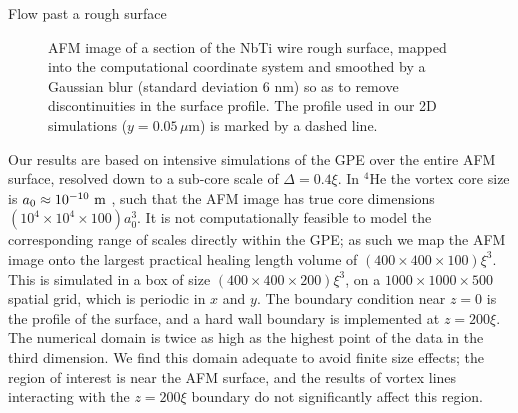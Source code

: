 \begin{chapter}{\label{cha:afm}Flow past a rough surface}
\begin{figure}
  \centering
  \caption{\label{fig:afmsmooth}AFM image of a section of the NbTi wire rough surface, mapped into the computational coordinate system and smoothed by a Gaussian blur (standard deviation 6 nm) so as to remove discontinuities in the surface profile. The profile used in our 2D simulations ($y=0.05\,\mu$m) is marked by a dashed line.}
\end{figure}

Our results are based on intensive simulations of the GPE over the entire AFM surface, resolved down to a sub-core scale of $\Delta=0.4\xi$. In $^4$He the vortex core size is $a_0 \approx 10^{-10}~\rm m$ \cite{Rayfield1964}, such that the AFM image has true core dimensions $(10^4 \times 10^4 \times 100) a_0^3$.  It is not computationally feasible to model the corresponding range of scales directly within the GPE; as such we map the AFM image onto the largest practical healing length volume of $(400 \times 400 \times 100) \xi^3$.  This is simulated in a box of size $(400 \times 400 \times 200) \xi^3$, on a $1000\times 1000\times 500$ spatial grid, which is periodic in $x$ and $y$. The boundary condition near $z=0$ is the profile of the surface, and a hard wall boundary is implemented at $z=200\xi$. The numerical domain is twice as high as the highest point of the data in the third dimension. We find this domain adequate to avoid finite size effects; the region of interest is near the AFM surface, and the results of vortex lines interacting with the $z=200\xi$ boundary do not significantly affect this region.


\end{chapter}
